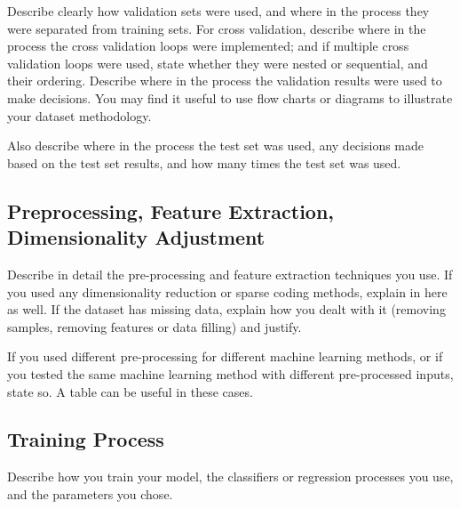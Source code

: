 \documentclass[singlecolumn]{article}
\begin{document}
Describe clearly how validation sets were used, and where in the process they were separated from training sets. For cross validation, describe where in the process the cross validation loops were implemented; and if multiple cross validation loops were used, state whether they were nested or sequential, and their ordering.  Describe where in the process the validation results were used to make decisions.  You may find it useful to use flow charts or diagrams to illustrate your dataset methodology.
  
Also describe where in the process the test set was used, any decisions made based on the test set results, and how many times the test set was used.

\subsection{Preprocessing, Feature Extraction, Dimensionality Adjustment}
Describe in detail the pre-processing and feature extraction techniques you use. If you used any dimensionality reduction or sparse coding methods, explain in here as well. If the dataset has missing data, explain how you dealt with it (removing samples, removing features or data filling) and justify.

If you used different pre-processing for different machine learning methods, or if you tested the same machine learning method with different pre-processed inputs, state so. A table can be useful in these cases. 

\subsection{Training Process}
Describe how you train your model, the classifiers or regression processes you use, and the parameters you chose. 
\end{document}
